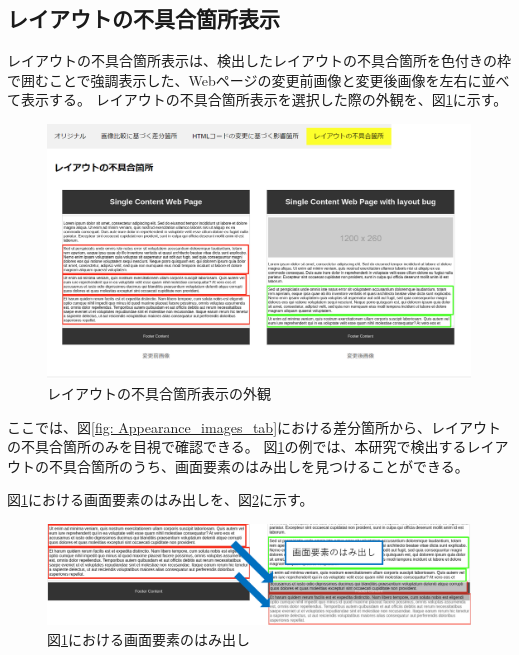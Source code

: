 \subsection{レイアウトの不具合箇所表示}\label{subsec:subeffect_tab}
レイアウトの不具合箇所表示は、検出したレイアウトの不具合箇所を色付きの枠で囲むことで強調表示した、Webページの変更前画像と変更後画像を左右に並べて表示する。
レイアウトの不具合箇所表示を選択した際の外観を、図\ref{fig: Appearance_subEffect_tab}に示す。
\begin{figure}[tp]
      \begin{center}
            \includegraphics[width=1.0\columnwidth]{image/3_subEffect_tab_2.png}
            \caption{レイアウトの不具合箇所表示の外観}
            \label{fig: Appearance_subEffect_tab}
      \end{center}
\end{figure}
ここでは、図\ref{fig: Appearance_images_tab}における差分箇所から、レイアウトの不具合箇所のみを目視で確認できる。
図\ref{fig: Appearance_subEffect_tab}の例では、本研究で検出するレイアウトの不具合箇所のうち、画面要素のはみ出しを見つけることができる。
\par
図\ref{fig: Appearance_subEffect_tab}における画面要素のはみ出しを、図\ref{fig: out_of_element}に示す。
\begin{figure}[tp]
      \begin{center}
            \includegraphics[width=1.0\columnwidth]{image/3_hamidasi_3.png}
            \caption{図\ref{fig: Appearance_subEffect_tab}における画面要素のはみ出し}
            \label{fig: out_of_element}
      \end{center}
\end{figure}
